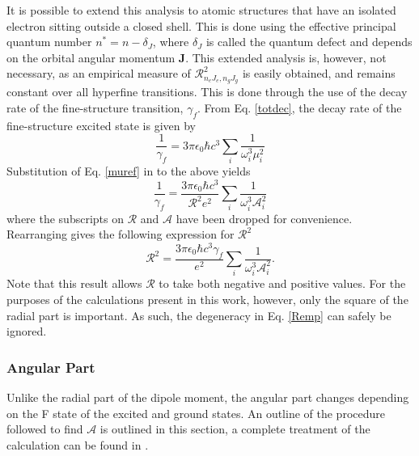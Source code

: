 It is possible to extend this analysis to atomic structures that have an isolated electron sitting outside a closed shell. This is done using the effective principal quantum number $n^*= n - \delta_{J}$, where $\delta_{J}$ is called the quantum defect and depends on the orbital angular momentum \textbf{J}. This extended analysis is, however, not necessary, as an empirical measure of $ \mathcal{R}^2_{n_e J_e, n_g J_g}$ is easily obtained, and remains constant over all hyperfine transitions. This is done through the use of the decay rate of the fine-structure transition, $\gamma_f$. From Eq. \ref{totdec}, the decay rate of the fine-structure excited state is given by
\begin{equation}
\frac{1}{\gamma_f} = 3 \pi \epsilon_0 \hbar c^3 \sum_i \frac{1}{\omega_i^3 \mu_i^2}
\end{equation}
Substitution of Eq. \ref{muref} in to the above yields
\begin{equation}
\frac{1}{\gamma_f} = \frac{3 \pi \epsilon_0 \hbar c^3}{\mathcal{R}^2e^2} \sum_i \frac{1}{\omega_i^3\mathcal{A}^2_i}
\end{equation}
where the subscripts on $\mathcal{R}$ and $\mathcal{A}$ have been dropped for convenience. Rearranging gives the following expression for $\mathcal{R}^2$
\begin{equation}
\mathcal{R}^2 = \frac{3 \pi \epsilon_0 \hbar c^3 \gamma_f}{e^2} \sum_i \frac{1}{\omega_i^3\mathcal{A}^2_i}.
\label{Remp}
\end{equation}
Note that this result allows $\mathcal{R}$ to take both negative and positive values. For the purposes of the calculations present in this work, however, only the square of the radial part is important. As such, the degeneracy in Eq. \ref{Remp} can safely be ignored. 
\subsubsection*{Angular Part}
Unlike the radial part of the dipole moment, the angular part changes depending on the F state of the excited and ground states. An outline of the procedure followed to find $\mathcal{A}$ is outlined in this section, a complete treatment of the calculation can be found in \cite{LasCool}. 

